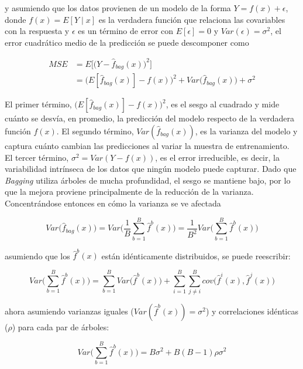 y asumiendo que los datos provienen de un modelo de la forma $Y = f(x) + \epsilon$, donde $f(x) = E[Y \mid x]$ es la verdadera función que relaciona las covariables con la respuesta y $\epsilon$ es un término de error con $E[\epsilon] = 0$ y $Var(\epsilon) = \sigma^2$, el error cuadrático medio de la predicción se puede descomponer como

\begin{equation}
    \begin{aligned}
    MSE &= E\Big[\big(Y-\hat{f}_{bag}(x)\big)^2\Big] \\
        &= \Big(E[\hat{f}_{bag}(x)] - f(x)\Big)^2 + Var\Big(\hat{f}_{bag}(x)\Big) + \sigma^2
    \end{aligned}
    \label{eq:bias-variance}
\end{equation}

El primer término, $\big(E[\hat{f}_{bag}(x)] - f(x)\big)^2$, es el sesgo al cuadrado y mide cuánto se desvía, en promedio, la predicción del modelo respecto de la verdadera función $f(x)$. El segundo término, $Var(\hat{f}_{bag}(x))$, es la varianza del modelo y captura cuánto cambian las predicciones al variar la muestra de entrenamiento. El tercer término, $\sigma^2 = Var(Y - f(x))$, es el error irreducible, es decir, la variabilidad intrínseca de los datos que ningún modelo puede capturar. Dado que \textit{Bagging} utiliza árboles de mucha profundidad, el sesgo se mantiene bajo, por lo que la mejora proviene principalmente de la reducción de la varianza. Concentrándose entonces en cómo la varianza se ve afectada

\begin{equation}
    Var\Big(\hat{f}_{bag}(x)\Big)=Var\Bigg(\frac{1}{B}\sum_{b=1}^{B}\hat{f}^b(x)\Bigg)=\frac{1}{B^2}Var\Bigg(\sum_{b=1}^{B}\hat{f}^b(x)\Bigg)
\end{equation}

asumiendo que los $\hat{f}^b(x)$ están idénticamente distribuidos, se puede reescribir:

\begin{equation}
    Var\Bigg(\sum_{b=1}^{B}\hat{f}^b(x)\Bigg)=\sum_{b=1}^B Var\Big(\hat{f}^b(x)\Big) + \sum_{i=1}^B\sum_{j\neq i}^B cov\Big(\hat{f}^i(x), \hat{f}^j(x)\Big)
\end{equation}

ahora asumiendo varianzas iguales ($Var(\hat{f}^b(x))=\sigma^2$) y correlaciones idénticas ($\rho$) para cada par de árboles:

\begin{equation}
    Var\Bigg(\sum_{b=1}^{B}\hat{f}^b(x)\Bigg)=B\sigma^2 + B(B-1)\rho\sigma^{2}
\end{equation}

